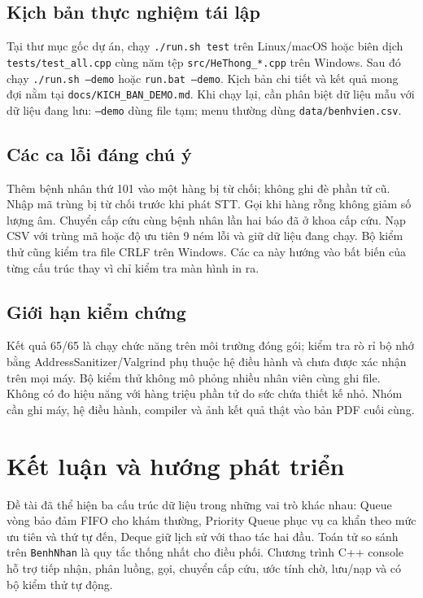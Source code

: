 \documentclass[12pt,a4paper,oneside]{report}
\begin{document}
\section{Kịch bản thực nghiệm tái lập}
Tại thư mục gốc dự án, chạy \texttt{./run.sh test} trên Linux/macOS hoặc biên dịch \texttt{tests/test\_all.cpp} cùng năm tệp \texttt{src/HeThong\_*.cpp} trên Windows. Sau đó chạy \texttt{./run.sh --demo} hoặc \texttt{run.bat --demo}. Kịch bản chi tiết và kết quả mong đợi nằm tại \texttt{docs/KICH\_BAN\_DEMO.md}. Khi chạy lại, cần phân biệt dữ liệu mẫu với dữ liệu đang lưu: \texttt{--demo} dùng file tạm; menu thường dùng \texttt{data/benhvien.csv}.

\section{Các ca lỗi đáng chú ý}
Thêm bệnh nhân thứ 101 vào một hàng bị từ chối; không ghi đè phần tử cũ. Nhập mã trùng bị từ chối trước khi phát STT. Gọi khi hàng rỗng không giảm số lượng âm. Chuyển cấp cứu cùng bệnh nhân lần hai báo đã ở khoa cấp cứu. Nạp CSV với trùng mã hoặc độ ưu tiên 9 ném lỗi và giữ dữ liệu đang chạy. Bộ kiểm thử cũng kiểm tra file CRLF trên Windows. Các ca này hướng vào bất biến của từng cấu trúc thay vì chỉ kiểm tra màn hình in ra.

\section{Giới hạn kiểm chứng}
Kết quả 65/65 là chạy chức năng trên môi trường đóng gói; kiểm tra rò rỉ bộ nhớ bằng AddressSanitizer/Valgrind phụ thuộc hệ điều hành và chưa được xác nhận trên mọi máy. Bộ kiểm thử không mô phỏng nhiều nhân viên cùng ghi file. Không có đo hiệu năng với hàng triệu phần tử do sức chứa thiết kế nhỏ. Nhóm cần ghi máy, hệ điều hành, compiler và ảnh kết quả thật vào bản PDF cuối cùng.

\chapter{Kết luận và hướng phát triển}
Đề tài đã thể hiện ba cấu trúc dữ liệu trong những vai trò khác nhau: Queue vòng bảo đảm FIFO cho khám thường, Priority Queue phục vụ ca khẩn theo mức ưu tiên và thứ tự đến, Deque giữ lịch sử với thao tác hai đầu. Toán tử so sánh trên \texttt{BenhNhan} là quy tắc thống nhất cho điều phối. Chương trình C++ console hỗ trợ tiếp nhận, phân luồng, gọi, chuyển cấp cứu, ước tính chờ, lưu/nạp và có bộ kiểm thử tự động.
\end{document}
